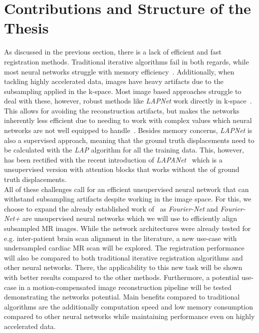 \section{Contributions and Structure of the Thesis} \label{Sec:ContributionsAndStructure}
As discussed in the previous section, there is a lack of efficient and fast registration methods. Traditional iterative algorithms fail in both regards, while most neural networks struggle with memory efficiency~\cite{Fourier-Net,Fourier-Net+}. Additionally, when tackling highly accelerated data, images have heavy artifacts due to the subsampling applied in the k-space. Most image based approaches struggle to deal with these, however, robust methods like \emph{LAPNet} work directly in k-space~\cite{LAPNet}. This allows for avoiding the reconstruction artifacts, but makes the networks inherently less efficient due to needing to work with complex values which neural networks are not well equipped to handle~\cite{Trabelsi2017}. Besides memory concerns, \emph{LAPNet} is also a supervised approach, meaning that the ground truth displacements need to be calculated with the \emph{LAP} algorithm for all the training data. This, however, has been rectified with the recent introduction of \emph{LAPANet}~\cite{LAPANet} which is a unsupervised version with attention blocks that works without the of ground truth displacements.\\
All of these challenges call for an efficient unsupervised neural network that can withstand subsampling artifacts despite working in the image space. For this, we choose to expand the already established work of~\cite{Fourier-Net,Fourier-Net+} as \emph{Fourier-Net} and \emph{Fourier-Net+} are unsupervised neural networks which we will use to efficiently align subsampled MR images. While the network architectures were already tested for e.g. inter-patient brain scan alignment in the literature, a new use-case with undersampled cardiac MR scan will be explored. The registration performance will also be compared to both traditional iterative registration algorithms and other neural networks. There, the applicability to this new task will be shown with better results compared to the other methods. Furthermore, a potential use-case in a motion-compensated image reconstruction pipeline will be tested demonstrating the networks potential. Main benefits compared to traditional algorithms are the additionally computation speed and low memory consumption compared to other neural networks while maintaining performance even on highly accelerated data.\\

